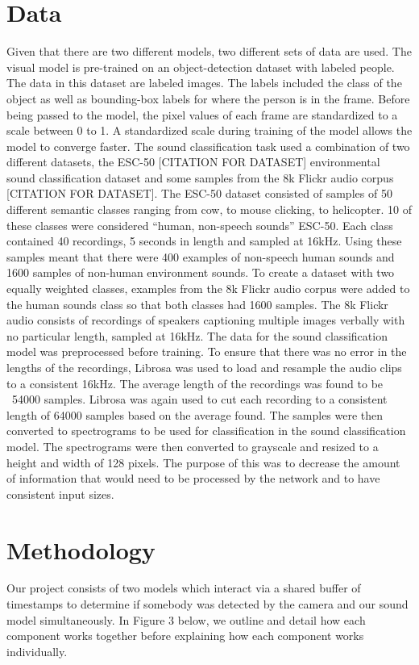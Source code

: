 \documentclass{article}
\begin{document}
\section{Data}
Given that there are two different models, two different sets of data are used. The visual model is pre-trained on an object-detection dataset with labeled people. The data in this dataset are labeled images. The labels included the class of the object as well as bounding-box labels for where the person is in the frame. Before being passed to the model, the pixel values of each frame are standardized to a scale between 0 to 1. A standardized scale during training of the model allows the model to converge faster.
The sound classification task used a combination of two different datasets, the ESC-50 [CITATION FOR DATASET] environmental sound classification dataset and some samples from the 8k Flickr audio corpus [CITATION FOR DATASET]. The ESC-50 dataset consisted of samples of 50 different semantic classes ranging from cow, to mouse clicking, to helicopter. 10 of these classes were considered “human, non-speech sounds” {ESC-50}. Each class contained 40 recordings, 5 seconds in length and sampled at 16kHz. Using these samples meant that there were 400 examples of non-speech human sounds and 1600 samples of non-human environment sounds. To create a dataset with two equally weighted classes, examples from the 8k Flickr audio corpus were added to the human sounds class so that both classes had 1600 samples. The 8k Flickr audio consists of recordings of speakers captioning multiple images verbally with no particular length, sampled at 16kHz. 
The data for the sound classification model was preprocessed before training. To ensure that there was no error in the lengths of the recordings, Librosa was used to load and resample the audio clips to a consistent 16kHz. The average length of the recordings was found to be ~54000 samples. Librosa was again used to cut each recording to a consistent length of 64000 samples based on the average found. The samples were then converted to spectrograms to be used for classification in the sound classification model. The spectrograms were then converted to grayscale and resized to a height and width of 128 pixels. The purpose of this was to decrease the amount of information that would need to be processed by the network and to have consistent input sizes.


\section{Methodology}
Our project consists of two models which interact via a shared buffer of timestamps to determine if somebody was detected by the camera and our sound model simultaneously. In Figure 3 below, we outline and detail how each component works together before explaining how each component works individually.
\end{document}
